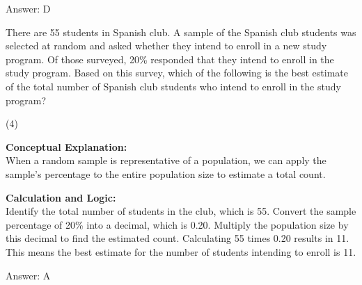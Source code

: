 \documentclass[11pt,paper=a4,answers]{exam}
\begin{document}
\begin{questions}
\begin{solution}
\vspace{30pt}

Answer: \colorbox{yellow!100}{D}
\end{solution}

\vspace{60pt}

\question
There are 55 students in Spanish club. A sample of the Spanish club students was selected at random and asked whether they intend to enroll in a new study program. Of those surveyed, 20\% responded that they intend to enroll in the study program. Based on this survey, which of the following is the best estimate of the total number of Spanish club students who intend to enroll in the study program?
\begin{tasks}(4)
\end{tasks}

\begin{solution}
\textbf{Conceptual Explanation:} \\
When a random sample is representative of a population, we can apply the sample's percentage to the entire population size to estimate a total count.

\vspace{30pt}

\textbf{Calculation and Logic:} \\
Identify the total number of students in the club, which is 55. Convert the sample percentage of 20\% into a decimal, which is 0.20. Multiply the population size by this decimal to find the estimated count. Calculating 55 times 0.20 results in 11. This means the best estimate for the number of students intending to enroll is 11.

\vspace{30pt}

Answer: \colorbox{yellow!100}{A}
\end{solution}

\vspace{60pt}

\question


\end{questions}
\end{document}

